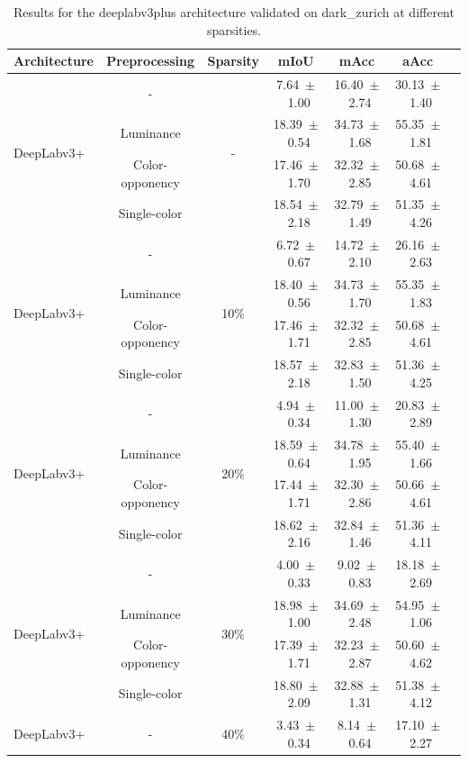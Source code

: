 \begin{table}[h]
\centering
\caption{Results for the deeplabv3plus architecture validated on dark_zurich at different sparsities.}
\begin{tabular}{@{}lccc ccc@{}}
\toprule
Architecture & Preprocessing & Sparsity & mIoU & mAcc & aAcc \\
\midrule

\multirow{4}{*}{DeepLabv3+} & - & \multirow{4}{*}{-} & 7.64~$\pm$~1.00 & 16.40~$\pm$~2.74 & 30.13~$\pm$~1.40 \\
& Luminance & & 18.39~$\pm$~0.54 & 34.73~$\pm$~1.68 & 55.35~$\pm$~1.81 \\
& Color-opponency & & 17.46~$\pm$~1.70 & 32.32~$\pm$~2.85 & 50.68~$\pm$~4.61 \\
& Single-color & & 18.54~$\pm$~2.18 & 32.79~$\pm$~1.49 & 51.35~$\pm$~4.26 \\
\midrule
\multirow{4}{*}{DeepLabv3+} & - & \multirow{4}{*}{10\%} & 6.72~$\pm$~0.67 & 14.72~$\pm$~2.10 & 26.16~$\pm$~2.63 \\
& Luminance & & 18.40~$\pm$~0.56 & 34.73~$\pm$~1.70 & 55.35~$\pm$~1.83 \\
& Color-opponency & & 17.46~$\pm$~1.71 & 32.32~$\pm$~2.85 & 50.68~$\pm$~4.61 \\
& Single-color & & 18.57~$\pm$~2.18 & 32.83~$\pm$~1.50 & 51.36~$\pm$~4.25 \\
\midrule
\multirow{4}{*}{DeepLabv3+} & - & \multirow{4}{*}{20\%} & 4.94~$\pm$~0.34 & 11.00~$\pm$~1.30 & 20.83~$\pm$~2.89 \\
& Luminance & & 18.59~$\pm$~0.64 & 34.78~$\pm$~1.95 & 55.40~$\pm$~1.66 \\
& Color-opponency & & 17.44~$\pm$~1.71 & 32.30~$\pm$~2.86 & 50.66~$\pm$~4.61 \\
& Single-color & & 18.62~$\pm$~2.16 & 32.84~$\pm$~1.46 & 51.36~$\pm$~4.11 \\
\midrule
\multirow{4}{*}{DeepLabv3+} & - & \multirow{4}{*}{30\%} & 4.00~$\pm$~0.33 & 9.02~$\pm$~0.83 & 18.18~$\pm$~2.69 \\
& Luminance & & 18.98~$\pm$~1.00 & 34.69~$\pm$~2.48 & 54.95~$\pm$~1.06 \\
& Color-opponency & & 17.39~$\pm$~1.71 & 32.23~$\pm$~2.87 & 50.60~$\pm$~4.62 \\
& Single-color & & 18.80~$\pm$~2.09 & 32.88~$\pm$~1.31 & 51.38~$\pm$~4.12 \\
\midrule
\multirow{4}{*}{DeepLabv3+} & - & \multirow{4}{*}{40\%} & 3.43~$\pm$~0.34 & 8.14~$\pm$~0.64 & 17.10~$\pm$~2.27 \\

\end{tabular}
\end{table}
